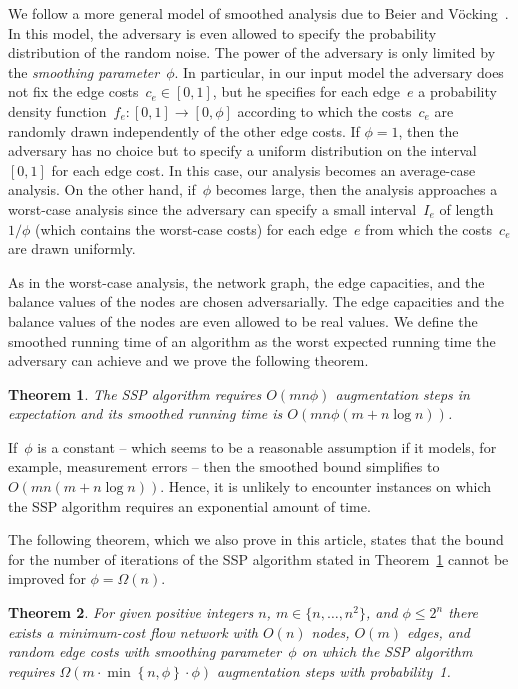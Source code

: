 \documentclass[11pt]{article}
\newtheorem{theorem}{Theorem}
\newcommand{\SET}[1]{\left\{#1\right\}}
\newcommand{\sSET}[1]{\{#1\}}
\begin{document}
We follow a more general model of smoothed analysis due to Beier and V{\"o}cking~\cite{BeierV04}. In this model, the adversary is even
allowed to specify the probability distribution of the random noise. The power of the adversary is only limited by the \emph{smoothing
parameter}~$\phi$. In particular, in our input model the adversary does not fix the edge costs~$c_e \in [0, 1]$, but he
specifies for each edge~$e$ a probability density function~$f_e \colon [0, 1] \to [0, \phi]$ according to which the costs~$c_e$ are randomly
drawn independently of the other edge costs. If $\phi = 1$, then the adversary has no choice but to specify a uniform distribution on the
interval~$[0, 1]$ for each edge cost. In this case, our analysis becomes an average-case analysis. On the other hand, if~$\phi$ becomes
large, then the analysis approaches a worst-case analysis since the adversary can specify a small interval~$I_e$ of length~$1/\phi$ (which
contains the worst-case costs) for each edge~$e$ from which the costs~$c_e$ are drawn uniformly.

As in the worst-case analysis, the network graph, the edge capacities, and the balance values of the nodes are chosen adversarially. The edge capacities and the balance values of the nodes are even allowed to be real values.
We define the smoothed running time of an algorithm as the worst expected running time the adversary can achieve and we prove the following theorem.

\begin{theorem}
\label{maintheorem}
The SSP algorithm requires $O(mn\phi)$ augmentation steps in expectation and its smoothed running time is $O(mn\phi (m + n\log n))$.
\end{theorem}

If~$\phi$ is a constant -- which seems to be a reasonable assumption if it models, for example, measurement errors -- then the smoothed bound simplifies to $O(mn (m + n\log n))$. Hence, it is unlikely to encounter instances on which the SSP algorithm requires an exponential amount of time.





The following theorem, which we also prove in this article, states that the bound for the number of iterations of the SSP algorithm stated in Theorem~\ref{maintheorem} cannot be improved for $\phi = \Omega(n)$. 

\begin{theorem}
\label{theorem:lower bound}
For given positive integers $n$, $m \in \sSET{ n, \ldots, n^2 }$, and $\phi \le 2^{n}$ there exists a minimum-cost flow network with $O(n)$ nodes, $O(m)$ edges, and random edge costs with smoothing parameter~$\phi$ on which the SSP algorithm requires $\Omega(m \cdot \min \SET{ n, \phi } \cdot \phi)$ augmentation steps with probability~1.
\end{theorem}
\end{document}
